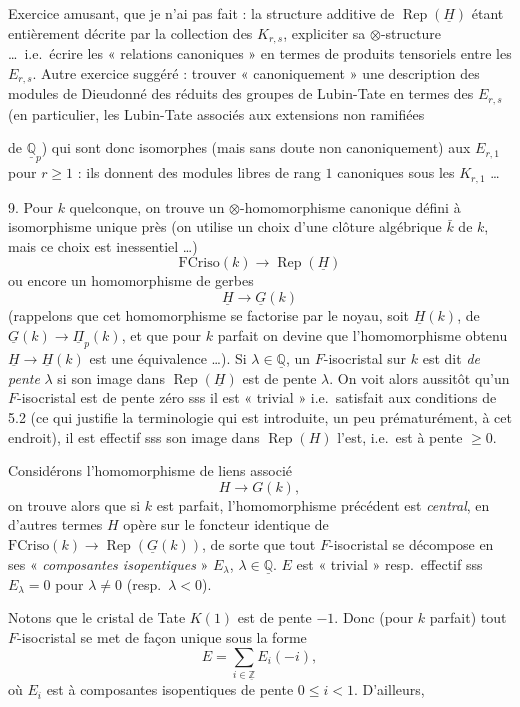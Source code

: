 \documentclass[11pt,a4paper]{article}
\begin{document}
\supplied{[}Exercice amusant, que je n'ai pas fait : la structure additive de
$\operatorname{Rep}(\underline{H})$ étant entièrement décrite par la
collection des $K_{r,s}$, expliciter sa $\otimes$-structure …\ i.e.\
écrire les « relations canoniques » en termes de produits tensoriels entre
les $E_{r,s}$. Autre exercice suggéré : trouver « canoniquement » une
description des modules de Dieudonné des réduits des groupes de Lubin-Tate en
termes des $E_{r,s}$ (en particulier, les Lubin-Tate associés aux extensions
non ramifiées

de $\underline{\mathbb{Q}}_{p}$) qui sont donc isomorphes
(mais sans doute non canoniquement) aux $E_{r,1}$ pour $r \geq 1$ : ils
donnent des modules libres de rang $1$ canoniques sous les
$K_{r,1}$ …\add{]}

9. \quad Pour $k$ quelconque, on trouve un \struck{\ill{}}
$\otimes$-homomorphisme canonique \struck{\ill{}} défini à isomorphisme
unique près (on utilise un choix d'une clôture algébrique $\bar{k}$ de $k$,
mais ce choix est inessentiel …)
\[
\mathrm{FCriso}(k) \longrightarrow \operatorname{Rep}(\underline{H})
\]
ou encore un homomorphisme de gerbes
\[
\underline{H} \longrightarrow \underline{G}(k)
\]
(rappelons que cet homomorphisme se factorise par le noyau, \struck{\ill{}}
soit \struck{\ill{}} $\underline{H}(k)$, de
$\underline{G}(k) \to \underline{\Pi}_{p}(k)$, et que pour $k$ parfait on
devine que l'homomorphisme obtenu
$\underline{H} \to \underline{H}(k)$ est une équivalence …). Si
$\lambda \in \underline{\mathbb{Q}}$, un $F$-isocristal sur $k$ est dit
\struck{\ill{}} \emph{de pente} $\lambda$ si son image dans
$\operatorname{Rep}(\underline{H})$ est de pente $\lambda$. On voit alors
aussitôt qu'un $F$-isocristal est de pente zéro sss il est « trivial » i.e.\
satisfait aux conditions de 5.2 (ce qui justifie la terminologie qui est
introduite, un peu prématurément, à cet endroit), il est effectif sss son
image dans $\operatorname{Rep}(H)$ l'est, i.e.\ est à pente $\geq 0$.

Considérons l'homomorphisme de liens associé
\[
H \longrightarrow G(k) ,
\]
on trouve alors que si $k$ est parfait, l'homomorphisme précédent est
\emph{central}, en d'autres termes $H$ opère sur le foncteur identique
de $\mathrm{FCriso}(k) \to \operatorname{Rep}(\underline{G}(k))$, de sorte
que tout $F$-isocristal \add{$(E, F_{E})$} se décompose en ses
« \emph{composantes isopentiques} » $E_{\lambda}$,
$\lambda \in \underline{\mathbb{Q}}$. $E$ est « trivial » resp.\ effectif sss
$E_{\lambda} = 0$ pour $\lambda \neq 0$ (resp.\ $\lambda < 0$).

Notons que le \supplied{$F$-iso}cristal de Tate $K(1)$ est de pente $-1$. Donc
(pour $k$ parfait) tout $F$-isocristal se met de façon unique sous la forme
\[
E = \sum_{i \in \underline{\mathbb{Z}}} E_{i}(-i) ,
\]
où $E_{i}$ est à composantes isopentiques de pente $0 \leq i < 1$.
D'ailleurs,
\end{document}
